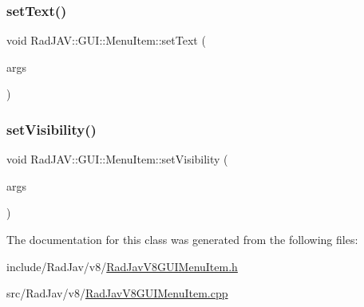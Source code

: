 \mbox{\label{class_rad_j_a_v_1_1_g_u_i_1_1_menu_item_ab649c3151c925389d63aff34fd8fda0c}} 
\subsubsection{\texorpdfstring{set\+Text()}{setText()}}
{\footnotesize\ttfamily void Rad\+J\+A\+V\+::\+G\+U\+I\+::\+Menu\+Item\+::set\+Text (\begin{DoxyParamCaption}\item[{const v8\+::\+Function\+Callback\+Info$<$ v8\+::\+Value $>$ \&}]{args }\end{DoxyParamCaption})\hspace{0.3cm}{\ttfamily [static]}}

\mbox{\label{class_rad_j_a_v_1_1_g_u_i_1_1_menu_item_acba74b6337938ad27ff0ab98ba7cd10b}} 
\subsubsection{\texorpdfstring{set\+Visibility()}{setVisibility()}}
{\footnotesize\ttfamily void Rad\+J\+A\+V\+::\+G\+U\+I\+::\+Menu\+Item\+::set\+Visibility (\begin{DoxyParamCaption}\item[{const v8\+::\+Function\+Callback\+Info$<$ v8\+::\+Value $>$ \&}]{args }\end{DoxyParamCaption})\hspace{0.3cm}{\ttfamily [static]}}



The documentation for this class was generated from the following files\+:\begin{DoxyCompactItemize}
\item 
include/\+Rad\+Jav/v8/\mbox{\hyperlink{_rad_jav_v8_g_u_i_menu_item_8h}{Rad\+Jav\+V8\+G\+U\+I\+Menu\+Item.\+h}}\item 
src/\+Rad\+Jav/v8/\mbox{\hyperlink{_rad_jav_v8_g_u_i_menu_item_8cpp}{Rad\+Jav\+V8\+G\+U\+I\+Menu\+Item.\+cpp}}\end{DoxyCompactItemize}
